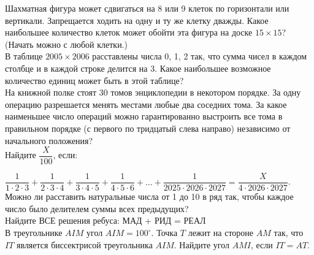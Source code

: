  Шахматная фигура может сдвигаться на 8 или 9 клеток по горизонтали или вертикали. Запрещается ходить на одну и ту же клетку дважды.
Какое наибольшее количество клеток может обойти эта фигура на доске $15\times15$? (Начать можно с любой клетки.)\\



 В таблице $2005\times2006$ расставлены числа 0, 1, 2 так, что сумма чисел в каждом столбце и в каждой строке делится на 3.
Какое наибольшее возможное количество единиц может быть в этой таблице?\\


  На книжной полке стоят 30 томов энциклопедии в некотором порядке. За одну операцию разрешается менять местами любые два соседних тома. За какое наименьшее число операций можно гарантированно выстроить все тома в правильном порядке (с первого по тридцатый слева направо) независимо от начального положения?\\

 Найдите $\dfrac{X}{100}$, если:

$\dfrac{1}{1 \cdot 2 \cdot 3}+\dfrac{1}{2 \cdot 3 \cdot 4}+\dfrac{1}{3 \cdot 4 \cdot 5}+\dfrac{1}{4 \cdot 5 \cdot 6}+\ldots+\dfrac{1}{2025 \cdot 2026 \cdot 2027}=\dfrac{X}{4\cdot2026\cdot2027}$.\\

 Можно ли расставить натуральные числа от 1 до 10 в ряд так, чтобы каждое число было делителем суммы всех предыдущих?\\

 Найдите ВСЕ решения ребуса: МАД + РИД = РЕАЛ\\

 В треугольнике $AIM$ угол $AIM=100^{\circ}$. Точка $T$ лежит на стороне $AM$ так, что $IT$ является биссектрисой треугольника $AIM$. Найдите угол $AMI$, если $IT=AT$.






